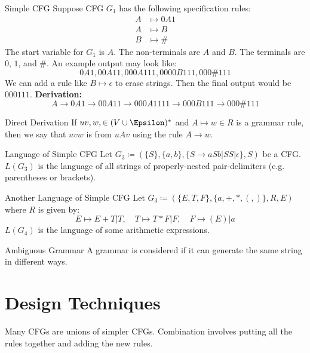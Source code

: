 \begin{exbox}{Simple CFG}{}
    Suppose CFG $G_1$ has the following specification rules:
    \begin{align*}
        A &\mapsto 0A1 \\
        A &\mapsto B \\
        B &\mapsto \#
    \end{align*}
    The start variable for $G_1$ is $A$. The non-terminals are $A$ and $B$. The terminals are $0$, $1$, and $\#$. An example output may look like:
    \[ 0A1, 00A11, 000A111, 0000B111, 000\#111 \]
    We can add a rule like $B \mapsto \epsilon$ to erase strings. Then the final output would be $000111$.
    \tcblower
    \textbf{Derivation:}
    \[ A \to 0A1 \to 00A11 \to 000A1111 \to 000B111 \to 000\#111 \]
\end{exbox}

\begin{dfnbox}{Direct Derivation}{}
    If $uv,w, \in (V \cup \Epsilon)^*$ and $A \mapsto w \in R$ is a grammar rule, then we say that $uvw$ is  from $uAv$ using the rule $A \to w$.
\end{dfnbox}

\begin{exbox}{Language of Simple CFG}{}
    Let $G_3 \coloneq (\{S\}, \{a,b\}, \{S \to aSb | SS | \epsilon\}, S)$ be a CFG. $L(G_3)$ is the language of all strings of properly-nested pair-delimiters (e.g. parentheses or brackets).
\end{exbox}

\begin{exbox}{Another Language of Simple CFG}{}
    Let $G_3 \coloneq (\{E,T,F\}, \{a, +, *, (, )\}, R, E)$ where $R$ is given by:
    \[ E \mapsto E + T | T,\quad T \mapsto T * F | F,\quad F \mapsto (E) | a \]
    $L(G_4)$ is the language of some arithmetic expressions.
\end{exbox}

\begin{dfnbox}{Ambiguous Grammar}{}
    A grammar is considered  if it can generate the same string in different ways.
\end{dfnbox}

\section{Design Techniques}
Many CFGs are unions of simpler CFGs. Combination involves putting all the rules together and adding the new rules.

